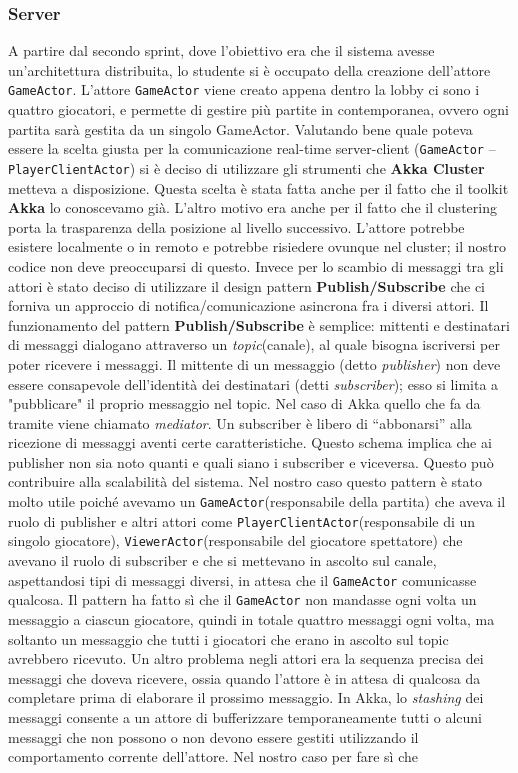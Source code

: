  \subsubsection{Server}\label{subsub:jakova:server}
A partire dal secondo sprint, dove l’obiettivo era che il sistema avesse un’architettura distribuita, lo studente si è occupato della creazione dell’attore \texttt{GameActor}. L’attore \texttt{GameActor} viene creato appena dentro la lobby ci sono i quattro giocatori, e permette di gestire più partite in contemporanea, ovvero ogni partita sarà gestita da un singolo GameActor. Valutando bene quale poteva essere la scelta giusta per la comunicazione real-time server-client (\texttt{GameActor} – \texttt{PlayerClientActor}) si è deciso di utilizzare gli strumenti che \textbf{Akka Cluster} metteva a disposizione. Questa scelta è stata fatta anche per il fatto che il toolkit \textbf{Akka} lo conoscevamo già. L’altro motivo era anche per il fatto che il clustering porta la trasparenza della posizione al livello successivo. L'attore potrebbe esistere localmente o in remoto e potrebbe risiedere ovunque nel cluster; il nostro codice non deve preoccuparsi di questo. Invece per lo scambio di messaggi tra gli attori è stato deciso di utilizzare il design pattern \textbf{Publish/Subscribe} che ci forniva un approccio di notifica/comunicazione asincrona fra i diversi attori. Il funzionamento del pattern \textbf{Publish/Subscribe} è semplice: mittenti e destinatari di messaggi dialogano attraverso un \textit{topic}(canale), al quale bisogna iscriversi per poter ricevere i messaggi. Il mittente di un messaggio (detto \textit{publisher}) non deve essere consapevole dell'identità dei destinatari (detti \textit{subscriber}); esso si limita a "pubblicare" il proprio messaggio nel topic. Nel caso di Akka quello che fa da tramite viene chiamato \textit{mediator}. Un subscriber è libero di “abbonarsi” alla ricezione di messaggi aventi certe caratteristiche. Questo schema implica che ai publisher non sia noto quanti e quali siano i subscriber e viceversa. Questo può contribuire alla scalabilità del sistema. Nel nostro caso questo pattern è stato molto utile poiché avevamo un \texttt{GameActor}(responsabile della partita) che aveva il ruolo di publisher e altri attori come \texttt{PlayerClientActor}(responsabile di un singolo giocatore), \texttt{ViewerActor}(responsabile del giocatore spettatore) che avevano il ruolo di subscriber e che si mettevano in ascolto sul canale, aspettandosi tipi di messaggi diversi, in attesa che il \texttt{GameActor} comunicasse qualcosa. Il pattern ha fatto sì che il \texttt{GameActor} non mandasse ogni volta un messaggio a ciascun giocatore, quindi in totale quattro messaggi ogni volta, ma soltanto un messaggio che tutti i giocatori che erano in ascolto sul topic avrebbero ricevuto. Un altro problema negli attori era la sequenza precisa dei messaggi che doveva ricevere, ossia quando l'attore è in attesa di qualcosa da completare prima di elaborare il prossimo messaggio. In Akka, lo \textit{stashing} dei messaggi consente a un attore di bufferizzare temporaneamente tutti o alcuni messaggi che non possono o non devono essere gestiti utilizzando il comportamento corrente dell'attore. Nel nostro caso per fare sì che 